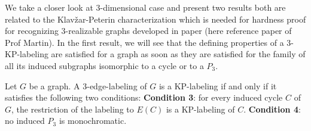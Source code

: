 \documentclass[12pt,a4paper,titlepage,openany]{report}
\begin{document}
We take a closer look at 3-dimensional case and present two results both are related to the Klav\v zar-Peterin characterization which is needed for hardness proof for recognizing 3-realizable graphs developed in paper (here reference paper of Prof Martin).\newline
In the first result, we will see that the defining properties of a 3-KP-labeling are satisfied for a graph as soon as they are satisfied for the family of all its induced subgraphs isomorphic to a cycle or to a $P_3$.

\begin{theorem}\label{3-edge-label}
Let $G$ be a graph. A 3-edge-labeling of $G$ is a KP-labeling if and only if it satisfies the following two conditions:\newline
\textbf{Condition 3}: for every induced cycle $C$ of $G$, the restriction of the labeling to $E(C)$ is
a KP-labeling of $C$.\newline
\textbf{Condition 4}: no induced $P_3$ is monochromatic.
\end{theorem}
\end{document}
